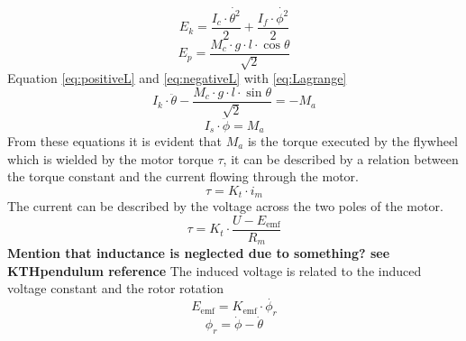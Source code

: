 \documentclass[a4paper,11pt]{kth-mag}
\begin{document}
\begin{equation}
E_k = \frac{I_c \cdot \dot{\theta^2}}{2} + \frac{I_f \cdot \dot{\phi^2} }{2}
\end{equation}
\begin{equation}
E_p = \frac{M_c \cdot g \cdot l \cdot \cos \theta}{\sqrt{2}}
\end{equation}
Equation \eqref{eq:positiveL} and \eqref{eq:negativeL} with \eqref{eq:Lagrange}
\begin{equation} \label{eq:negativeL2}
I_k \cdot \ddot{\theta} - \frac{M_c \cdot g \cdot l \cdot \sin \theta }{\sqrt{2}}  = -M_a
\end{equation}
\begin{equation} \label{eq:postiveL2}
I_s \cdot \ddot{\phi} = M_a
\end{equation}
From these equations it is evident that $M_a$ is the torque executed by the flywheel which is wielded by the motor torque $\tau$, it can be described by a relation between the torque constant and the current flowing through the motor.
\begin{equation}
\tau = K_t \cdot i_m
\end{equation}
The current can be described by the voltage across the two poles of the motor. 
\begin{equation}
\tau = K_t \cdot \frac{U-E_{\text{emf}} }{R_m}
\end{equation}
\textbf{Mention that inductance is neglected due to something? see KTHpendulum reference}
The induced voltage is related to the induced voltage constant and the rotor rotation
\begin{equation}
E_{\text{emf}} = K_{\text{emf}} \cdot \dot{\phi_r}
\end{equation}
\begin{equation}
\phi_r = \dot{\phi} - \dot{\theta}
\end{equation}
 
\end{document}
